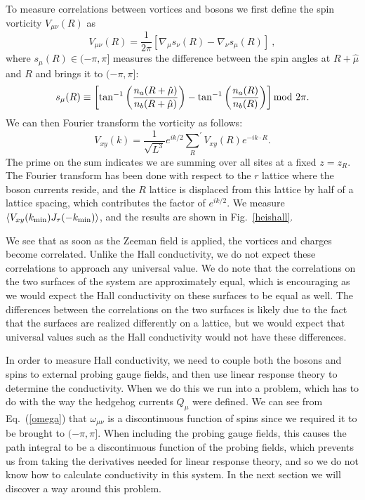 \documentclass[prb,twocolumn]{revtex4-1}
\def\ra{\rangle} %
\def\la{\langle} %
\begin{document}
To measure correlations between vortices and bosons we first define the spin vorticity $V_{\mu\nu}(R)$ as
\begin{equation}
V_{\mu\nu}(R) = \frac{1}{2\pi}[\nabla_\mu s_{\nu}(R) - \nabla_\nu s_{\mu}(R)] ~,
\end{equation}
where $s_\mu(R) \in (-\pi, \pi]$ measures the difference between the spin angles at $R+\hat{\mu}$ and $R$ and brings it to $(-\pi,\pi]$:
\begin{equation}
s_{\mu}(R)\equiv \left[\tan^{-1}\left(\frac{n_a(R+\hat{\mu})}{n_b(R+\hat{\mu})}\right) -\tan^{-1}\left(\frac{n_a(R)}{n_b(R)}\right)\right]{\rm mod}~2\pi.\nonumber
\end{equation}
We can then Fourier transform the vorticity as follows:
\begin{equation}
V_{xy}(k) = \frac{1}{\sqrt{L^3}}e^{ik/2}{\sum_{R}}^\prime V_{xy}(R) e^{-ik\cdot R}.
\end{equation}
The prime on the sum indicates we are summing over all sites at a fixed $z=z_R$. The Fourier transform has been done with respect to the $r$ lattice where the boson currents reside, and the $R$ lattice is displaced from this lattice by half of a lattice spacing, which contributes the factor of $e^{ik/2}$. We measure $\la V_{xy}(k_{\rm min})J_\tau(-k_{\rm min})\ra$, and the results are shown in Fig.~\ref{heishall}. 

We see that as soon as the Zeeman field is applied, the vortices and charges become correlated. Unlike the Hall conductivity, we do not expect these correlations to approach any universal value. We do note that the correlations on the two surfaces of the system are approximately equal, which is encouraging as we would expect the Hall conductivity on these surfaces to be equal as well. The differences between the correlations on the two surfaces is likely due to the fact that the surfaces are realized differently on a lattice, but we would expect that universal values such as the Hall conductivity would not have these differences.

In order to measure Hall conductivity, we need to couple both the bosons and spins to external probing gauge fields, and then use linear response theory to determine the conductivity. When we do this we run into a problem, which has to do with the way the hedgehog currents $Q_\mu$ were defined. We can see from Eq.~(\ref{omega}) that $\omega_{\mu\nu}$ is a discontinuous function of spins since we required it to be brought to $(-\pi, \pi]$. When including the probing gauge fields, this causes the path integral to be a discontinuous function of the probing fields, which prevents us from taking the derivatives needed for linear response theory, and so we do not know how to calculate conductivity in this system. In the next section we will discover a way around this problem.
\end{document}
